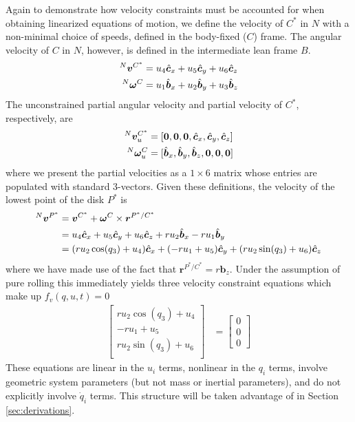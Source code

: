 Again to demonstrate how velocity constraints must be accounted for when
obtaining linearized equations of motion, we define the velocity of $C^*$ in
$N$ with a non-minimal choice of speeds, defined in the body-fixed ($C$) frame.
The angular velocity of $C$ in $N$, however, is defined in the intermediate
lean frame $B$.
\begin{align}
  \label{v_u}
  {^N}\boldsymbol{v}^{C^*} &= u_4 \hat{\boldsymbol{c}}_{x} + u_5 \hat{\boldsymbol{c}}_{y} + u_6 \hat{\boldsymbol{c}}_{z} \\
  \label{w_u}
  {^N}\boldsymbol{\omega}^C &= u_1 \hat{\boldsymbol{b}}_{x} + u_2 \hat{\boldsymbol{b}}_{y} + u_3 \hat{\boldsymbol{b}}_{z}
\end{align}
The unconstrained partial angular velocity and partial velocity of $C^*$,
respectively, are
\begin{align}
  {^N}\boldsymbol{v}^{C^*}_u &= [\boldsymbol{0}, \boldsymbol{0}, \boldsymbol{0}, \hat{\boldsymbol{c}}_{x}, \hat{\boldsymbol{c}}_{y}, \hat{\boldsymbol{c}}_{z}] \\
  {^N}\boldsymbol{\omega}^C_u &= [\hat{\boldsymbol{b}}_{x}, \hat{\boldsymbol{b}}_{y}, \hat{\boldsymbol{b}}_{z}, \boldsymbol{0}, \boldsymbol{0}, \boldsymbol{0}]
\end{align}
where we present the partial velocities as a $1\times6$ matrix whose entries
are populated with standard 3-vectors. Given these definitions, the velocity of
the lowest point of the disk $P^*$ is
\begin{align*}
  {^N}\boldsymbol{v}^{P^*} &= \boldsymbol{v}^{C^*} + \boldsymbol{\omega}^{C} \times \boldsymbol{r}^{P^*/C^*} \\
  &= u_4\hat{\boldsymbol{c}}_{x} + u_5\hat{\boldsymbol{c}}_{y} + u_6\hat{\boldsymbol{c}}_{z} + r u_2
  \hat{\boldsymbol{b}}_{x} - r u_1 \hat{\boldsymbol{b}}_{y} \\
  &= (r u_2 \cos(q_3) + u_4) \hat{\boldsymbol{c}}_{x} + (-r u_1 + u_5)\hat{\boldsymbol{c}}_{y} + (r u_2 \sin(q_3) +
  u_6) \hat{\boldsymbol{c}}_{z}
\end{align*}
where we have made use of the fact that $\bm{r}^{P^*/C^*} = r\bm{b}_z$.
Under the assumption of pure rolling this immediately yields three velocity
constraint equations which make up $f_v(q, u, t) = 0$
\begin{subequations}
\label{rd:f_v}
\begin{align}
  \begin{bmatrix}
    r u_2 \cos(q_3) + u_4 \\
    -r u_1 + u_5 \\
    r u_2 \sin(q_3) + u_6 \\
  \end{bmatrix} &=
  \begin{bmatrix} 0 \\ 0 \\ 0 \end{bmatrix}
\end{align}
\end{subequations}
These equations are linear in the $u_i$ terms, nonlinear in the $q_i$ terms,
involve geometric system parameters (but not mass or inertial parameters), and
do not explicitly involve $\dot{q}_i$ terms. This structure will be taken
advantage of in Section \ref{sec:derivations}.

